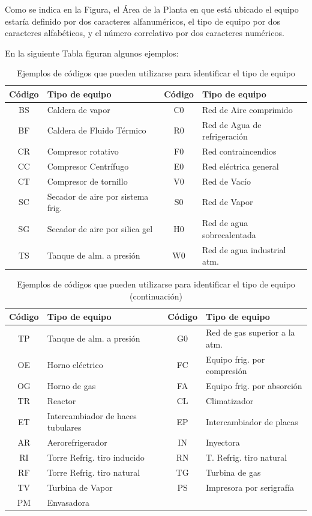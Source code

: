 Como se indica en la Figura, el Área de la Planta en que está ubicado
el equipo estaría definido por dos caracteres alfanuméricos, el tipo de
equipo por dos caracteres alfabéticos, y el número correlativo por dos caracteres numéricos.

En la siguiente Tabla figuran algunos ejemplos:

\begin{table}[h!]
    \centering
    \begin{tabular}{|c|l|c|l|}\hline
Código & Tipo de equipo & Código & Tipo de equipo\\\hline
BS & Caldera de vapor & C0 &Red de Aire comprimido \\
BF & Caldera de Fluido Térmico & R0 & Red de Agua de refrigeración \\
CR & Compresor rotativo &F0 &Red contraincendios\\
CC & Compresor Centrífugo & E0 & Red eléctrica general\\
CT & Compresor de tornillo & V0 & Red de Vacío\\
SC &Secador de aire por sistema frig. & S0 & Red de Vapor \\
SG &Secador de aire por silica gel &H0& Red de agua sobrecalentada \\
TS &Tanque de alm. a presión &W0& Red de agua industrial
atm.\\ \hline


    \end{tabular}
    \caption{Ejemplos de códigos que pueden
utilizarse para identificar el tipo de equipo}
    
\end{table}

\begin{table}[h!]
    \centering
    \begin{tabular}{|c|l|c|l|}\hline
Código & Tipo de equipo & Código & Tipo de equipo\\\hline
TP &Tanque de alm. a presión &G0& Red de gas
superior a la atm.\\
OE& Horno eléctrico &FC& Equipo frig. por compresión\\
OG& Horno de gas &FA& Equipo frig. por absorción\\
TR& Reactor &CL& Climatizador\\
ET& Intercambiador de haces tubulares &EP& Intercambiador de placas\\
AR& Aerorefrigerador &IN& Inyectora\\
RI& Torre Refrig. tiro inducido &RN& T. Refrig. tiro natural\\
RF& Torre Refrig. tiro natural &TG& Turbina de gas\\
TV& Turbina de Vapor &PS& Impresora por serigrafía\\
PM& Envasadora & & \\ \hline
    \end{tabular}
    \caption{Ejemplos de códigos que pueden
utilizarse para identificar el tipo de equipo (continuación)}
   
\end{table}

